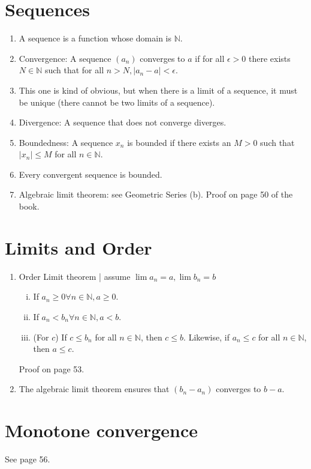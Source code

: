 \documentclass{article}
\begin{document}
\section*{Sequences}
\begin{enumerate}
    \item A sequence is a function whose domain is $\mathbb{N}$.
    \item Convergence: A sequence $(a_n)$ converges to $a$ if for all $\epsilon > 0$ there exists $N \in \mathbb{N}$ such that for all $n > N, |a_n - a| < \epsilon$.
    \item This one is kind of obvious, but when there is a limit of a sequence, it must be unique (there cannot be two limits of a sequence).
    \item Divergence: A sequence that does not converge diverges.
    \item Boundedness: A sequence $x_n$ is bounded if there exists an $M > 0$ such that $|x_n|\leq M$ for all $n \in \mathbb{N}$.
    \item Every convergent sequence is bounded.
    \item Algebraic limit theorem: see Geometric Series (b). Proof on page 50 of the book.
\end{enumerate}

\section*{Limits and Order}
\begin{enumerate}
    \item Order Limit theorem | assume $\lim a_n = a, \lim b_n = b$
        \begin{enumerate}[(i)]
            \item If $a_n \geq 0 \forall n \in \mathbb{N}, a \geq 0.$
            \item If $a_n < b_n \forall n \in \mathbb{N}, a < b$.
            \item (For $c$) If $c \leq b_n$ for all $n \in \mathbb{N}$, then $c \leq b$. Likewise, if $a_n \leq c$ for all $n \in \mathbb{N}$, then $a \leq c.$
        \end{enumerate}
        Proof on page 53.
    \item The algebraic limit theorem ensures that $(b_n - a_n)$ converges to $b-a$.
\end{enumerate}

\section*{Monotone convergence}
See page 56.
\end{document}

